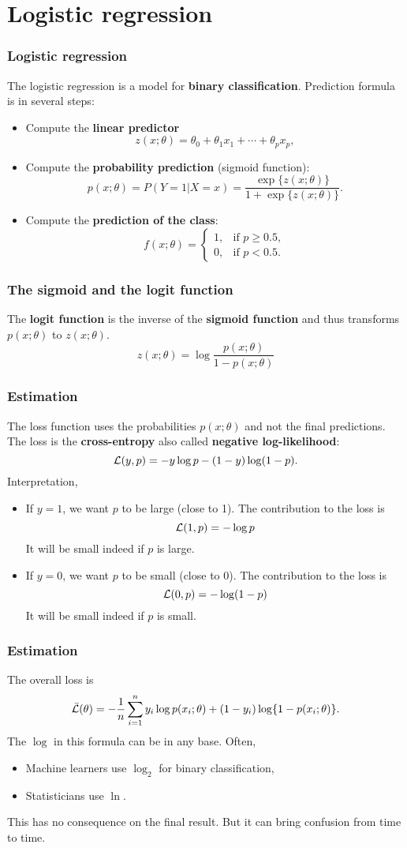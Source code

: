 \section{Logistic regression}
\begin{frame}
\frametitle{Logistic regression}
The logistic regression is a model for {\bf binary classification}. Prediction formula is in several steps:
\begin{itemize}
\item Compute the {\bf linear predictor}
$$
z(x;\theta) = \theta_0 + \theta_1 x_{1} + \cdots + \theta_p x_{p},
$$
\item Compute the {\bf probability prediction} (sigmoid function):
$$
p(x;\theta) = P(Y=1 | X=x) = \frac{\exp\{z(x;\theta)\}}{1+\exp\{z(x;\theta)\}}.
$$
\item Compute the {\bf prediction of the class}: 
$$
f(x;\theta) = \left\{
\begin{array}{ll}
1, & \mbox{if } p\geq 0.5,\\
0, & \mbox{if } p < 0.5.
\end{array}
\right.
$$
\end{itemize}
\end{frame}
\begin{frame}
\frametitle{The sigmoid and the logit function}
The {\bf logit function} is the inverse of the {\bf sigmoid function} and thus transforms $p(x;\theta)$ to $z(x;\theta)$.
$$
z(x;\theta) = \log \frac{p(x;\theta)}{1-p(x;\theta)}
$$ 
\end{frame}
\begin{frame}
\frametitle{Estimation}
The loss function uses the probabilities $p(x;\theta)$ and not the final predictions. The loss is the {\bf cross-entropy} also called {\bf negative log-likelihood}:
$$
{\cal L}(y,p) = -y \log p - (1-y) \log (1-p).
$$
Interpretation,
\begin{itemize}
\item If $y=1$, we want $p$ to be large (close to 1). The contribution to the loss is 
$$
{\cal L}(1,p) = - \log p
$$
It will be small indeed if $p$ is large.
\item If $y=0$, we want $p$ to be small (close to 0). The contribution to the loss is
$$
{\cal L}(0,p) = - \log (1-p)
$$
It will be small indeed if $p$ is small.
\end{itemize}
\end{frame}
\begin{frame}
\frametitle{Estimation}
The overall loss is
$$
\bar{{\cal L}}(\theta) = -\frac{1}{n} \sum_{i=1}^n y_i \log p(x_i;\theta) + (1-y_i) \log \{1-p(x_i;\theta)\}.
$$
The $\log$ in this formula can be in any base. Often,
\begin{itemize}
\item Machine learners use $\log_2$ for binary classification,
\item Statisticians use $\ln$.
\end{itemize}
This has no consequence on the final result. But it can bring confusion from time to time.
\end{frame}
